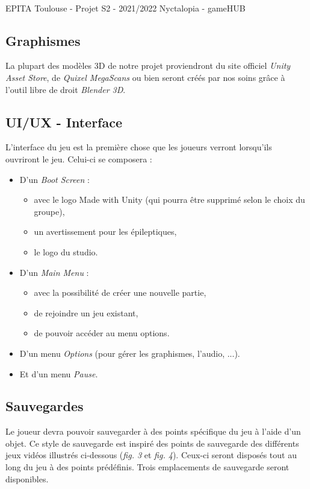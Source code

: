 \vfill
\noindent\makebox[\linewidth]{\rule{.8\paperwidth}{.6pt}}\\[0.2cm]
EPITA Toulouse - Projet S2 - 2021/2022 \hfill Nyctalopia - gameHUB
\noindent\makebox[\linewidth]{\rule{.8\paperwidth}{.6pt}}

\subsection{Graphismes}
\setlength{\parindent}{5ex}


La plupart des modèles 3D de notre projet proviendront du site officiel \emph{Unity Asset Store}, de \emph{Quixel MegaScans} ou bien seront créés par nos soins grâce à l'outil libre de droit \emph{Blender 3D}.

\subsection{UI/UX - Interface}
\setlength{\parindent}{5ex}
L'interface du jeu est la première chose que les joueurs verront lorsqu'ils ouvriront le jeu. Celui-ci se composera :
\begin{itemize}
    \item D'un \emph{Boot Screen} :
    \begin{itemize}
        \item avec le logo Made with Unity (qui pourra être supprimé selon le choix du groupe),
        \item un avertissement pour les épileptiques,
        \item le logo du studio.
    \end{itemize}
    \item D'un \emph{Main Menu} : 
    \begin{itemize}
        \item avec la possibilité de créer une nouvelle partie,
        \item de rejoindre un jeu existant,
        \item de pouvoir accéder au menu options.
    \end{itemize}
    \item D'un menu \emph{Options} (pour gérer les graphismes, l'audio, ...).
    \item Et d'un menu \emph{Pause}.
\end{itemize}

\subsection{Sauvegardes}
\setlength{\parindent}{5ex}
Le joueur devra pouvoir sauvegarder à des points spécifique du jeu à l'aide d'un objet. Ce style de sauvegarde est inspiré des points de sauvegarde des différents jeux vidéos illustrés ci-dessous (\emph{fig. 3} et \emph{fig. 4}).
Ceux-ci seront disposés tout au long du jeu à des points prédéfinis. Trois emplacements de sauvegarde seront disponibles.

